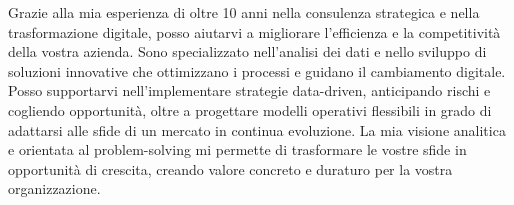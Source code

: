 Grazie alla mia esperienza di oltre 10 anni nella consulenza strategica e nella trasformazione digitale, posso aiutarvi a migliorare l’efficienza e la competitività della vostra azienda. Sono specializzato nell’analisi dei dati e nello sviluppo di soluzioni innovative che ottimizzano i processi e guidano il cambiamento digitale.
Posso supportarvi nell’implementare strategie data-driven, anticipando rischi e cogliendo opportunità, oltre a progettare modelli operativi flessibili in grado di adattarsi alle sfide di un mercato in continua evoluzione. La mia visione analitica e orientata al problem-solving mi permette di trasformare le vostre sfide in opportunità di crescita, creando valore concreto e duraturo per la vostra organizzazione.
